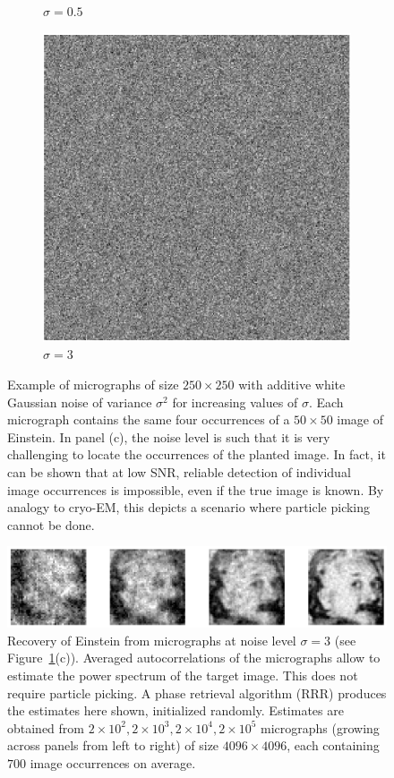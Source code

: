 \documentclass[12pt]{article}
\newcommand{\1}{\mathbf{1}}
\theoremstyle{plain}
\theoremstyle{definition}
\theoremstyle{remark}
\theoremstyle{plain}
\theoremstyle{remark}
\theoremstyle{plain}
\theoremstyle{plain}
\theoremstyle{plain}
\numberwithin{equation}{section}
\begin{document}
\begin{figure}[t]
\begin{subfigure}[h]{0.33\linewidth}
		\caption{$\sigma = 0.5$}
	\end{subfigure}
	\begin{subfigure}[h]{0.33\linewidth}
		\centering
		\includegraphics[width=.8\linewidth]{micrograph_Einstein_example_s3}
		\caption{$\sigma = 3$}
	\end{subfigure}
	\caption{\label{fig:micro_example} Example of micrographs of size $250\times 250$ with additive white Gaussian noise of variance $\sigma^2$ for increasing values of $\sigma$. Each micrograph contains the same four occurrences of a $50 \times 50$ image of Einstein. In panel (c), the noise level is such that it is very challenging to locate the occurrences of the planted image. In fact, it can be shown that at low SNR, reliable detection of individual image occurrences is impossible, even if the true image is known. By analogy to cryo-EM, this depicts a scenario where particle picking cannot be done.}
\end{figure}


\begin{figure}[t]
	\centering
	\includegraphics[width=1\linewidth]{Einstien_progress_examples}
	\caption{\label{fig:Einst_example} Recovery of Einstein from micrographs at noise level $\sigma = 3$ (see Figure~\ref{fig:micro_example}(c)). Averaged autocorrelations of the micrographs allow to estimate the power spectrum of the target image. This does not require particle picking. A phase retrieval algorithm (RRR) produces the estimates here shown, initialized randomly. Estimates are obtained from $2\times 10^2,2\times 10^3,2\times 10^4,2\times 10^5$ micrographs (growing across panels from left to right) of size $4096\times 4096$, each containing $700$ image occurrences on average.}	
\end{figure}
\end{document}
